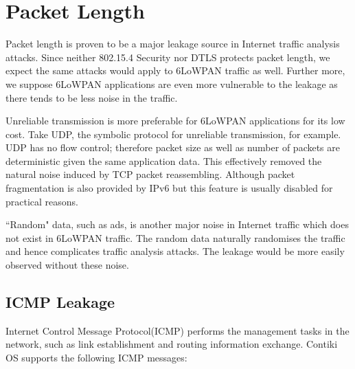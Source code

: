 \section{Packet Length}


Packet length is proven to be a major leakage source in Internet traffic analysis attacks. Since neither 802.15.4 Security nor DTLS protects packet length, we expect the same attacks would apply to 6LoWPAN traffic as well. Further more, we suppose 6LoWPAN applications are even more vulnerable to the leakage as there tends to be less noise in the traffic.

Unreliable transmission is more preferable for 6LoWPAN applications for its low cost. Take UDP, the symbolic protocol for unreliable transmission, for example. UDP has no flow control; therefore packet size as well as number of packets are deterministic given the same application data. This effectively removed the natural noise induced by TCP packet reassembling. Although packet fragmentation is also provided by IPv6 but this feature is usually disabled for practical reasons.

``Random" data, such as ads, is another major noise in Internet traffic which does not exist in 6LoWPAN traffic. The random data naturally randomises the traffic and hence complicates traffic analysis attacks. The leakage would be more easily observed without these noise.
\subsection{ICMP Leakage}


Internet Control Message Protocol(ICMP)\cite{rfc4443} performs the management tasks in the network, such as link establishment and routing information exchange. Contiki OS supports the following ICMP messages:

